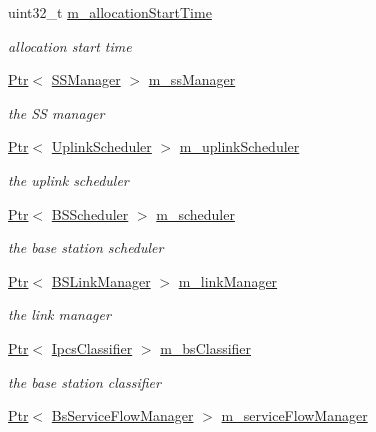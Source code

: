 \begin{DoxyCompactItemize}
uint32\+\_\+t \hyperlink{classns3_1_1BaseStationNetDevice_a43eceef47108da17d13dde57aebea1fb}{m\+\_\+allocation\+Start\+Time}
\begin{DoxyCompactList}\small\item\em allocation start time \end{DoxyCompactList}\item 
\hyperlink{classns3_1_1Ptr}{Ptr}$<$ \hyperlink{classns3_1_1SSManager}{S\+S\+Manager} $>$ \hyperlink{classns3_1_1BaseStationNetDevice_a2365fd053319dda930081e661e6381a6}{m\+\_\+ss\+Manager}
\begin{DoxyCompactList}\small\item\em the SS manager \end{DoxyCompactList}\item 
\hyperlink{classns3_1_1Ptr}{Ptr}$<$ \hyperlink{classns3_1_1UplinkScheduler}{Uplink\+Scheduler} $>$ \hyperlink{classns3_1_1BaseStationNetDevice_a14803d3fbd21b8777a8c7c7aeef8b8ba}{m\+\_\+uplink\+Scheduler}
\begin{DoxyCompactList}\small\item\em the uplink scheduler \end{DoxyCompactList}\item 
\hyperlink{classns3_1_1Ptr}{Ptr}$<$ \hyperlink{classns3_1_1BSScheduler}{B\+S\+Scheduler} $>$ \hyperlink{classns3_1_1BaseStationNetDevice_ae25a05b8fbaed29fd59277f928683a16}{m\+\_\+scheduler}
\begin{DoxyCompactList}\small\item\em the base station scheduler \end{DoxyCompactList}\item 
\hyperlink{classns3_1_1Ptr}{Ptr}$<$ \hyperlink{classns3_1_1BSLinkManager}{B\+S\+Link\+Manager} $>$ \hyperlink{classns3_1_1BaseStationNetDevice_af69e5b5c16f3fe5d6549cfc21340b7fa}{m\+\_\+link\+Manager}
\begin{DoxyCompactList}\small\item\em the link manager \end{DoxyCompactList}\item 
\hyperlink{classns3_1_1Ptr}{Ptr}$<$ \hyperlink{classns3_1_1IpcsClassifier}{Ipcs\+Classifier} $>$ \hyperlink{classns3_1_1BaseStationNetDevice_a6c1345e084e8b24efb463d90e2f0f85b}{m\+\_\+bs\+Classifier}
\begin{DoxyCompactList}\small\item\em the base station classifier \end{DoxyCompactList}\item 
\hyperlink{classns3_1_1Ptr}{Ptr}$<$ \hyperlink{classns3_1_1BsServiceFlowManager}{Bs\+Service\+Flow\+Manager} $>$ \hyperlink{classns3_1_1BaseStationNetDevice_a7ba16e6369f37b75fd026bf70561c6e9}{m\+\_\+service\+Flow\+Manager}

\end{DoxyCompactItemize}
